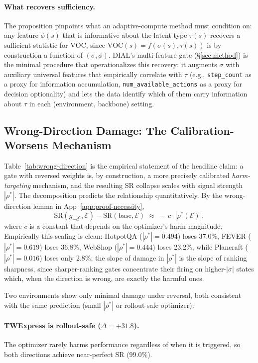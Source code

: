 \paragraph{What recovers sufficiency.}
The proposition pinpoints what an adaptive-compute method must
condition on: any feature $\phi(s)$ that is informative about
the latent type $\tau(s)$ recovers a sufficient statistic for
$\mathrm{VOC}$, since
$\mathrm{VOC}(s) = f(\sigma(s), \tau(s))$ is by construction a
function of $(\sigma, \phi)$. DIAL's multi-feature gate
(\S\ref{sec:method}) is the minimal procedure that operationalizes
this recovery: it augments $\sigma$ with auxiliary universal
features that empirically correlate with $\tau$ (e.g.,
\texttt{step\_count} as a proxy for information accumulation,
\texttt{num\_available\_actions} as a proxy for decision
optionality) and lets the data identify which of them carry
information about $\tau$ in each (environment, backbone) setting.

\subsection{Wrong-Direction Damage: The Calibration-Worsens
  Mechanism}
\label{app:wrong-direction}

Table~\ref{tab:wrong-direction} is the empirical statement of
the headline claim: a gate with reversed weights is, by
construction, a more precisely calibrated \emph{harm-targeting}
mechanism, and the resulting SR collapse scales with signal
strength $|\rho^*|$. The decomposition predicts the relationship
quantitatively. By the wrong-direction lemma in
App~\ref{app:proof-necessity},
\[
  \mathrm{SR}(g_{-d^*}, \mathcal{E}) -
  \mathrm{SR}(\mathrm{base}, \mathcal{E})
  \;\approx\; -\,c \cdot |\rho^*(\mathcal{E})|,
\]
where $c$ is a constant that depends on the optimizer's harm
magnitude. Empirically this scaling is clean: HotpotQA
($|\rho^*|{=}0.494$) loses 37.0\%, FEVER ($|\rho^*|{=}0.619$)
loses 36.8\%, WebShop ($|\rho^*|{=}0.444$) loses 23.2\%,
while Plancraft ($|\rho^*|{=}0.016$) loses only 2.8\%; the
slope of damage in $|\rho^*|$ is the slope of ranking
sharpness, since sharper-ranking gates concentrate their firing
on higher-$|\sigma|$ states which, when the direction is wrong,
are exactly the harmful ones.

Two environments show only minimal damage under reversal, both
consistent with the same prediction (small $|\rho^*|$ or
rollout-safe optimizer):

\paragraph{TWExpress is rollout-safe ($\Delta{=}{+}31.8$).}
The optimizer rarely harms performance regardless of when it is
triggered, so both directions achieve near-perfect SR (99.0\%).


